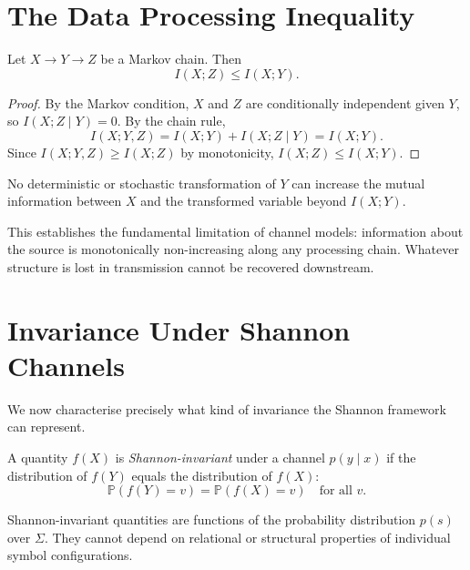 \documentclass[11pt,openany]{book}
\begin{document}
\section{The Data Processing Inequality}
\label{sec:data-processing}

\begin{theorem}
\label{thm:data-processing}
Let $X \to Y \to Z$ be a Markov chain.  Then
\[
  I(X;Z) \le I(X;Y).
\]
\end{theorem}

\begin{proof}
By the Markov condition, $X$ and $Z$ are conditionally
independent given $Y$, so $I(X;Z \mid Y) = 0$.  By the
chain rule,
\[
  I(X;Y,Z) = I(X;Y) + I(X;Z \mid Y) = I(X;Y).
\]
Since $I(X;Y,Z) \ge I(X;Z)$ by monotonicity,
$I(X;Z) \le I(X;Y)$.
\end{proof}

\begin{corollary}
\label{cor:no-creation}
No deterministic or stochastic transformation of $Y$ can
increase the mutual information between $X$ and the
transformed variable beyond $I(X;Y)$.
\end{corollary}

This establishes the fundamental limitation of channel
models: information about the source is monotonically
non-increasing along any processing chain.  Whatever
structure is lost in transmission cannot be recovered
downstream.

\section{Invariance Under Shannon Channels}
\label{sec:shannon-invariance}

We now characterise precisely what kind of invariance the
Shannon framework can represent.

\begin{definition}
\label{def:shannon-invariant}
A quantity $f(X)$ is \emph{Shannon-invariant} under a
channel $p(y \mid x)$ if the distribution of $f(Y)$
equals the distribution of $f(X)$:
\[
  \mathbb{P}(f(Y) = v) = \mathbb{P}(f(X) = v)
  \quad \text{for all } v.
\]
\end{definition}

\begin{proposition}
\label{prop:shannon-reduces}
Shannon-invariant quantities are functions of the
probability distribution $p(s)$ over $\Sigma$.  They
cannot depend on relational or structural properties of
individual symbol configurations.
\end{proposition}
\end{document}
